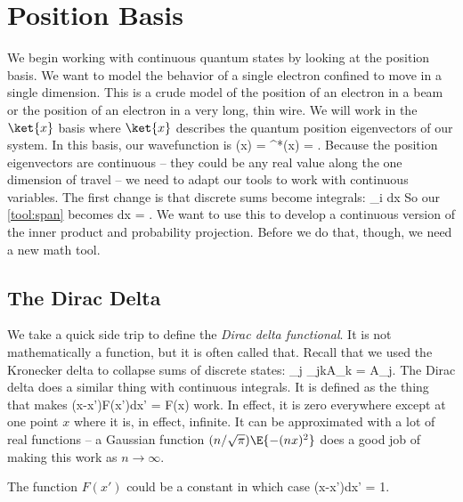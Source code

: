 \section{Position Basis}

We begin working with continuous quantum states by looking at the position basis. We want to model the behavior of a single electron confined to move in a single dimension. This is a crude model of the position of an electron in a beam or the position of an electron in a very long, thin wire. We will work in the $\ket{x}$ basis where $\ket{x}$ describes the quantum position eigenvectors of our system. In this basis, our wavefunction is 
\beq
\psi(x) =  \psi^*(x) = .
\label{eq:defwavefunction}
\eeq{}%
Because the position eigenvectors are continuous -- they could be any real value along the one dimension of travel -- we need to adapt our tools to work with continuous variables. The first change is that discrete sums become integrals:
\beq
\sum_i \rightarrow \int dx
\eeq
So our \ref{tool:span} becomes
\beq
\intii {} dx = \onehat.
\eeq{} We want to use this to develop a continuous version of the inner product and probability projection. Before we do that, though, we need a new math tool.

\subsection{The Dirac Delta}
We take a quick side trip to define the {\em Dirac delta functional}. It is not mathematically a function, but it is often called that. Recall that we used the Kronecker delta to collapse sums of discrete states:
\beq
\sum_j \delta_{jk}A_k = A_j.
\eeq
The Dirac delta does a similar thing with continuous integrals. It is defined as the thing that makes
\beq
\intii \delta(x-x')F(x')dx' = F(x)
\label{eq:diracdelta}
\eeq{}
work. In effect, it is zero everywhere except at one point $x$ where it is, in effect, infinite. It can be approximated with a lot of real functions -- a Gaussian function $(n/\sqrt{\pi})\E{-(nx)^2}$ does a good job of making this work as $n\rightarrow \infty$. \begin{marginfigure}
\end{marginfigure}
The function $F(x')$ could be a constant in which case
\beq
\intii \delta(x-x')dx' = 1.
\eeq

